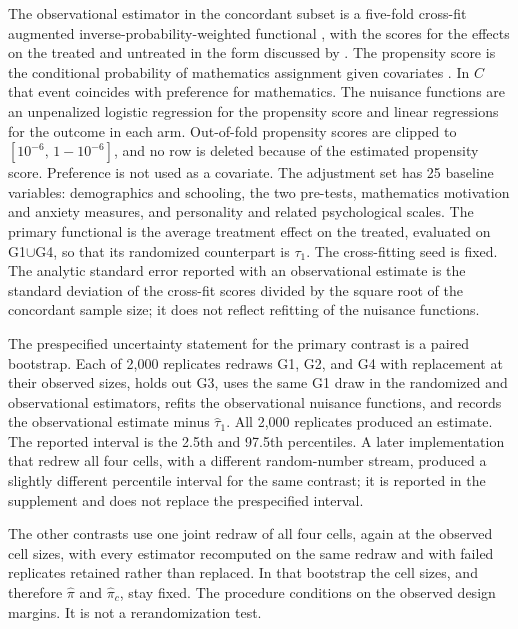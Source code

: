 \documentclass[twoside,11pt]{article}
\begin{document}
The observational estimator in the concordant subset is a five-fold cross-fit augmented inverse-probability-weighted functional \citep{bang2005,chernozhukov2018}, with the scores for the effects on the treated and untreated in the form discussed by \citet{hahn1998}. The propensity score is the conditional probability of mathematics assignment given covariates \citep{rosenbaum1983}. In $C$ that event coincides with preference for mathematics. The nuisance functions are an unpenalized logistic regression for the propensity score and linear regressions for the outcome in each arm. Out-of-fold propensity scores are clipped to $[10^{-6},\,1-10^{-6}]$, and no row is deleted because of the estimated propensity score. Preference is not used as a covariate. The adjustment set has 25 baseline variables: demographics and schooling, the two pre-tests, mathematics motivation and anxiety measures, and personality and related psychological scales. The primary functional is the average treatment effect on the treated, evaluated on G1$\cup$G4, so that its randomized counterpart is $\tau_1$. The cross-fitting seed is fixed. The analytic standard error reported with an observational estimate is the standard deviation of the cross-fit scores divided by the square root of the concordant sample size; it does not reflect refitting of the nuisance functions.

The prespecified uncertainty statement for the primary contrast is a paired bootstrap. Each of 2{,}000 replicates redraws G1, G2, and G4 with replacement at their observed sizes, holds out G3, uses the same G1 draw in the randomized and observational estimators, refits the observational nuisance functions, and records the observational estimate minus $\widehat\tau_1$. All 2{,}000 replicates produced an estimate. The reported interval is the 2.5th and 97.5th percentiles. A later implementation that redrew all four cells, with a different random-number stream, produced a slightly different percentile interval for the same contrast; it is reported in the supplement and does not replace the prespecified interval.

The other contrasts use one joint redraw of all four cells, again at the observed cell sizes, with every estimator recomputed on the same redraw and with failed replicates retained rather than replaced. In that bootstrap the cell sizes, and therefore $\widehat\pi$ and $\widehat\pi_c$, stay fixed. The procedure conditions on the observed design margins. It is not a rerandomization test.
\end{document}
